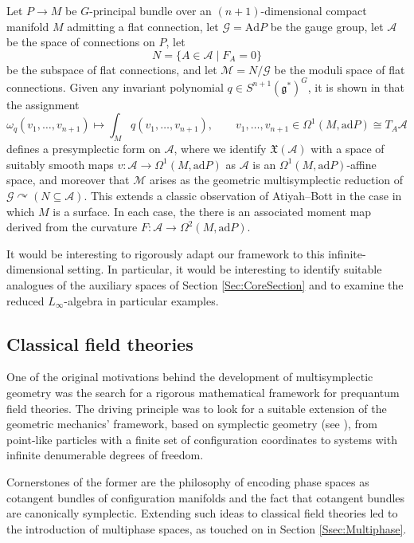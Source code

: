 \documentclass[10pt,a4paper]{amsart}
\numberwithin{equation}{section}
\newcommand{\g}{\mathfrak{g}}
\newcommand{\A}{\mathcal{A}}
\newcommand{\G}{\mathcal{G}}
\newcommand{\M}{\mathcal{M}}
\newcommand{\X}{\mathfrak{X}}
\newcommand{\ad}{\mathrm{ad}}
\newcommand{\Ad}{\mathrm{Ad}}
\renewcommand{\subset}{\subseteq}
\begin{document}
Let $P\to M$ be $G$-principal bundle over an $(n+1)$-dimensional compact manifold $M$ admitting a flat connection, let $\G=\Ad P$ be the gauge group, let $\A$ be the space of connections on $P$, let
\[
	N = \{ A\in\A \mid  F_A = 0\}
\]
be the subspace of flat connections, and let $\M=N/\G$ be the moduli space of flat connections. Given any invariant polynomial $q\in S^{n+1}(\g^*)^G$, it is shown in \cite[Section 10]{CalliesFregierRogersZambon16} that the assignment
\[
	\omega_q(v_1,\dots,v_{n+1}) \mapsto \int_M q(v_1,\dots, v_{n+1}),		\qquad v_1,\dots,v_{n+1}\in\Omega^1(M,\ad P)\cong T_A\A
\]
defines a presymplectic form on $\A$, where we identify $\X(\A)$ with a space of suitably smooth maps $v\colon \A\to\Omega^1(M,\ad P)$ as $\A$ is an $\Omega^1(M,\ad P)$-affine space, and moreover that $\M$ arises as the geometric multisymplectic reduction of $\G\curvearrowright(N\subset\A)$. This extends a classic observation of Atiyah--Bott \cite[Section 9]{AtiyahBott83} in the case in which $M$ is a surface. In each case, the there is an associated moment map derived from the curvature $F\colon \A\to\Omega^2(M,\ad P)$.

It would be interesting to rigorously adapt our framework to this infinite-dimensional setting. In particular, it would be interesting to identify suitable analogues of the auxiliary spaces of Section \ref{Sec:CoreSection} and to examine the reduced $L_\infty$-algebra in particular examples.


\subsection{Classical field theories}

One of the original motivations behind the development of multisymplectic geometry was the search for a rigorous mathematical framework for prequantum field theories.
The driving principle was to look for a suitable extension of the geometric mechanics' framework, based on symplectic geometry (see \cite{AbrahamMarsden78}), from point-like particles with a finite set of configuration coordinates to systems with infinite denumerable degrees of freedom.

Cornerstones of the former are the philosophy of encoding phase spaces as cotangent bundles of configuration manifolds and the fact that cotangent bundles are canonically symplectic.
Extending such ideas to classical field theories led to the introduction of multiphase spaces, as touched on in Section \ref{Ssec:Multiphase}.
\end{document}
